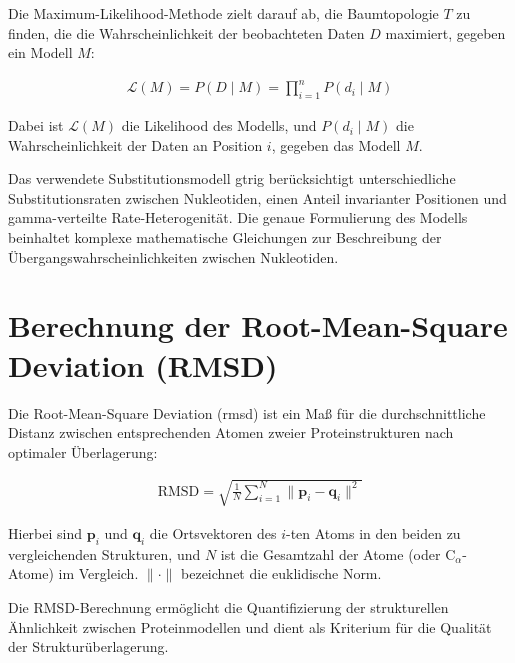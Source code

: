 Die Maximum-Likelihood-Methode zielt darauf ab, die Baumtopologie $T$ zu finden, die die Wahrscheinlichkeit der beobachteten Daten $D$ maximiert, gegeben ein Modell $M$:

\begin{align}
    \mathcal{L}(M) = P(D \mid M) = \prod_{i=1}^{n} P(d_i \mid M)
\end{align}

Dabei ist $\mathcal{L}(M)$ die Likelihood des Modells, und $P(d_i \mid M)$ die Wahrscheinlichkeit der Daten an Position $i$, gegeben das Modell $M$.

Das verwendete Substitutionsmodell \gls{gtrig} berücksichtigt unterschiedliche Substitutionsraten zwischen Nukleotiden, einen Anteil invarianter Positionen und gamma-verteilte Rate-Heterogenität. Die genaue Formulierung des Modells beinhaltet komplexe mathematische Gleichungen zur Beschreibung der Übergangswahrscheinlichkeiten zwischen Nukleotiden.

\section{Berechnung der Root-Mean-Square Deviation (RMSD)}

Die Root-Mean-Square Deviation (\gls{rmsd}) ist ein Maß für die durchschnittliche Distanz zwischen entsprechenden Atomen zweier Proteinstrukturen nach optimaler Überlagerung:

\begin{align}
    \text{RMSD} = \sqrt{\frac{1}{N} \sum_{i=1}^N \| \mathbf{p}_i - \mathbf{q}_i \|^2}
\end{align}

Hierbei sind $\mathbf{p}_i$ und $\mathbf{q}_i$ die Ortsvektoren des $i$-ten Atoms in den beiden zu vergleichenden Strukturen, und $N$ ist die Gesamtzahl der Atome (oder C$_\alpha$-Atome) im Vergleich. $\| \cdot \|$ bezeichnet die euklidische Norm.

Die RMSD-Berechnung ermöglicht die Quantifizierung der strukturellen Ähnlichkeit zwischen Proteinmodellen und dient als Kriterium für die Qualität der Strukturüberlagerung.

